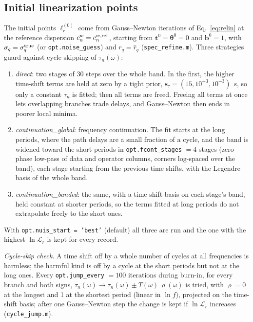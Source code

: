 \documentclass[11pt]{article}
\begin{document}
\subsection{Initial linearization points}\label{sec:start}
The initial points $\bm\ell^{(0)}_r$ come from Gauss--Newton iterations of
Eq.~\eqref{eq:relin} at the reference dispersion
$c^w_n=c^{w,\rm ref}_n$, starting from $\mathbf{t}^0=\bm\theta^0=0$ and
$\mathbf{b}^0=1$, with $\sigma_q=\sigma^{\rm true}_q$ (or
\texttt{opt.noise\_guess}) and $r_q=\hat r_q$ (\texttt{spec\_refine.m}).
Three strategies guard against cycle skipping of $\tau_n(\omega)$:
\begin{enumerate}
\item \emph{direct}: two stages of 30 steps over the whole band. In the
  first, the higher time-shift terms are held at zero by a tight prior,
  $\mathbf{s}_\tau=(15,10^{-3},10^{-3})$~s, so only a constant $\tau_n$ is
  fitted; then all terms are freed. Freeing all terms at once lets
  overlapping branches trade delays, and Gauss--Newton then ends in poorer
  local minima.
\item \emph{continuation\_global}: frequency continuation. The fit starts
  at the long periods, where the path delays are a small fraction of a
  cycle, and the band is widened toward the short periods in
  \texttt{opt.fcont\_stages} $=4$ stages (zero-phase low-pass of data and
  operator columns, corners log-spaced over the band), each stage starting
  from the previous time shifts, with the Legendre basis of the whole band.
\item \emph{continuation\_banded}: the same, with a time-shift basis on
  each stage's band, held constant at shorter periods, so the terms fitted
  at long periods do not extrapolate freely to the short ones.
\end{enumerate}
With \texttt{opt.nuis\_start = 'best'} (default) all three are run and the
one with the highest $\ln\mathcal{L}_r$ is kept for every record.

\emph{Cycle-skip check.} A time shift off by a whole number of cycles at
all frequencies is harmless; the harmful kind is off by a cycle at the
short periods but not at the long ones. Every \texttt{opt.jump\_every}
$=100$ iterations during burn-in, for every branch and both signs,
$\tau_n(\omega)\to\tau_n(\omega)\pm T(\omega)\,\varrho(\omega)$ is tried,
with $\varrho=0$ at the longest and 1 at the shortest period (linear in
$\ln f$), projected on the time-shift basis; after one Gauss--Newton step
the change is kept if $\ln\mathcal{L}_r$ increases (\texttt{cycle\_jump.m}).
\end{document}
